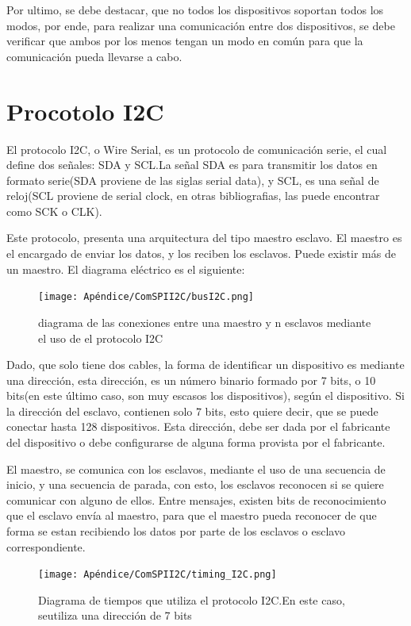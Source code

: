 Por ultimo, se debe destacar, que no todos los dispositivos soportan todos los modos, por ende, para realizar una comunicación entre dos dispositivos, se debe verificar que ambos por los menos tengan un modo en común para que la comunicación pueda llevarse a cabo. 



\section{Procotolo I2C}

El protocolo I2C, o Wire Serial, es un protocolo de comunicación serie, el cual define dos señales: SDA y SCL.La señal SDA es para transmitir los datos en formato serie(SDA proviene de las siglas serial data), y SCL, es una señal de reloj(SCL proviene de serial clock, en otras bibliografias, las puede encontrar como SCK o CLK). 

Este protocolo, presenta una arquitectura del tipo maestro esclavo. El maestro es el encargado de enviar los datos, y los reciben los esclavos. Puede existir más de un maestro. El diagrama eléctrico es el siguiente: 

\begin{figure}[ht]
	\texttt{[image: Apéndice/ComSPII2C/busI2C.png]}
	\caption{diagrama de las conexiones entre una maestro y n esclavos mediante el uso de el protocolo I2C} 
	\label{fig:busI2C}
\end{figure}

Dado, que solo tiene dos cables, la forma de identificar un dispositivo es mediante una dirección, esta dirección, es un número binario formado por 7 bits, o 10 bits(en este último caso, son muy escasos los dispositivos), según el dispositivo. Si la dirección del esclavo, contienen solo 7 bits, esto quiere decir, que se puede conectar hasta 128 dispositivos. Esta dirección, debe ser dada por el fabricante del dispositivo o debe configurarse de alguna forma provista por el fabricante.  

El maestro, se comunica con los esclavos, mediante el uso de una secuencia de inicio, y una secuencia de parada, con esto, los esclavos reconocen si se quiere comunicar con alguno de ellos. Entre mensajes, existen bits de reconocimiento que el esclavo envía al maestro, para que el maestro pueda reconocer de que forma se estan recibiendo los datos por parte de los esclavos o esclavo correspondiente. 

\begin{figure}[ht]
	\texttt{[image: Apéndice/ComSPII2C/timing\_I2C.png]}
	\caption{Diagrama de tiempos que utiliza el protocolo I2C.En este caso, seutiliza una dirección de 7 bits}
	\label{fig:timing_I2C}
\end{figure}

